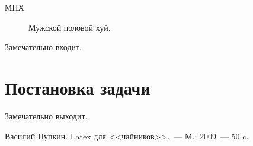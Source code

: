 \documentclass[utf8]{G7-32}
\begin{document}
\frontmatter

\begin{abstract}

\end{abstract}

\tableofcontents

\Abbreviations
\begin{description}
\item[МПХ] Мужской половой хуй.
\end{description}

\Introduction

Замечательно входит.

\mainmatter

\chapter{Постановка задачи}
\label{cha:whats-this-about}

\backmatter

\Conclusion

Замечательно выходит.

\begin{thebibliography}{99}
 Василий Пупкин. Latex для <<чайников>>.~--- М.: 2009~--- 50 c.
\end{thebibliography}
\end{document}
